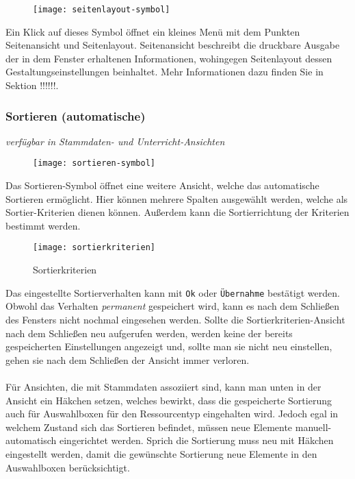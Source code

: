 \begin{wrapfigure}{r}{.06\textwidth}
	\vspace{-50pt}
	\texttt{[image: seitenlayout-symbol]}
	\vspace{-35pt}
\end{wrapfigure}

\noindent
Ein Klick auf dieses Symbol öffnet ein kleines Menü mit dem Punkten Seitenansicht und Seitenlayout. Seitenansicht beschreibt die druckbare Ausgabe der in dem Fenster erhaltenen Informationen, wohingegen Seitenlayout dessen Gestaltungseinstellungen beinhaltet. Mehr Informationen dazu finden Sie in Sektion !!!!!!.

\subsubsection{Sortieren (automatische)}
{\small\textit{verfügbar in Stammdaten- und Unterricht-Ansichten\\}\par}

\begin{wrapfigure}{r}{.05\textwidth}
	\vspace{-50pt}
	\texttt{[image: sortieren-symbol]}
	\vspace{-35pt}
\end{wrapfigure}

\noindent
Das Sortieren-Symbol öffnet eine weitere Ansicht, welche das automatische Sortieren ermöglicht. Hier können mehrere Spalten ausgewählt werden, welche als Sortier-Kriterien dienen können. Außerdem kann die Sortierrichtung der Kriterien bestimmt werden.\\

\begin{wrapfigure}{r}{0.3\textwidth}
	\texttt{[image: sortierkriterien]}
	\vspace{-15pt}
	\caption{Sortierkriterien}
	\label{fig:sortierkriterien}
\end{wrapfigure}

\noindent
Das eingestellte Sortierverhalten kann mit \texttt{Ok} oder \texttt{Übernahme} bestätigt werden. Obwohl das Verhalten \textit{permanent} gespeichert wird, kann es nach dem Schließen des Fensters nicht nochmal eingesehen werden. Sollte die Sortierkriterien-Ansicht nach dem Schließen neu aufgerufen werden, werden keine der bereits gespeicherten Einstellungen angezeigt und, sollte man sie nicht neu einstellen, gehen sie nach dem Schließen der Ansicht immer verloren.\\
\\
Für Ansichten, die mit Stammdaten assoziiert sind, kann man unten in der Ansicht ein Häkchen setzen, welches bewirkt, dass die gespeicherte Sortierung auch für Auswahlboxen für den Ressourcentyp eingehalten wird. Jedoch egal in welchem Zustand sich das Sortieren befindet, müssen neue Elemente manuell-automatisch eingerichtet werden. Sprich die Sortierung muss neu mit Häkchen eingestellt werden, damit die gewünschte Sortierung neue Elemente in den Auswahlboxen berücksichtigt.\\


